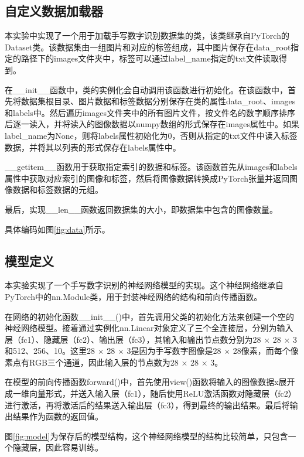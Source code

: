 \documentclass{report}
\begin{document}
	\subsection{自定义数据加载器}
	本实验中实现了一个用于加载手写数字识别数据集的类，该类继承自PyTorch的Dataset类。该数据集由一组图片和对应的标签组成，其中图片保存在data\_root指定的路径下的images文件夹中，标签可以通过label\_name指定的txt文件读取得到。
	
	在\_\_init\_\_函数中，类的实例化会自动调用该函数进行初始化。在该函数中，首先将数据集根目录、图片数据和标签数据分别保存在类的属性data\_root、images和labels中。然后遍历images文件夹中的所有图片文件，按文件名的数字顺序排序后逐一读入，并将读入的图像数据以numpy数组的形式保存在images属性中。如果label\_name为None，则将labels属性初始化为0，否则从指定的txt文件中读入标签数据，并将其以列表的形式保存在labels属性中。
	
	\_\_getitem\_\_函数用于获取指定索引的数据和标签。该函数首先从images和labels属性中获取对应索引的图像和标签，然后将图像数据转换成PyTorch张量并返回图像数据和标签数据的元组。
	
	最后，实现\_\_len\_\_函数返回数据集的大小，即数据集中包含的图像数量。
	
	具体编码如图\ref{fig:data}所示。
	
	
	\subsection{模型定义}
	本实验实现了一个手写数字识别的神经网络模型的实现。这个神经网络继承自PyTorch中的nn.Module类，用于封装神经网络的结构和前向传播函数。
	
	在网络的初始化函数\_\_init\_\_()中，首先调用父类的初始化方法来创建一个空的神经网络模型。接着通过实例化nn.Linear对象定义了三个全连接层，分别为输入层（fc1）、隐藏层（fc2）、输出层（fc3），其输入和输出节点数分别为28 $\times$ 28 $\times$ 3和512、256、10。这里28 $\times$ 28 $\times$ 3是因为手写数字图像是28 $\times$ 28像素，而每个像素点有RGB三个通道，因此输入层的节点数为28 $\times$ 28 $\times$ 3。
	
	在模型的前向传播函数forward()中，首先使用view()函数将输入的图像数据x展开成一维向量形式，并送入输入层（fc1），随后使用ReLU激活函数对隐藏层（fc2）进行激活，再将激活后的结果送入输出层（fc3），得到最终的输出结果。最后将输出结果作为函数的返回值。
	
	图\ref{fig:model}为保存后的模型结构，这个神经网络模型的结构比较简单，只包含一个隐藏层，因此容易训练。
	
\end{document}
